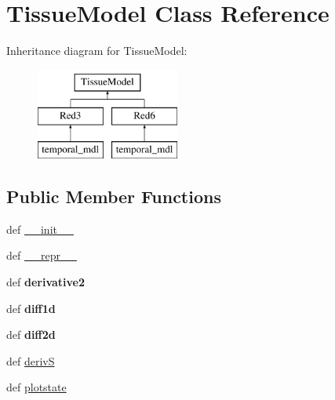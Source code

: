 \hypertarget{classcell__mdl2_1_1_tissue_model}{
\section{TissueModel Class Reference}
\label{classcell__mdl2_1_1_tissue_model}
}
Inheritance diagram for TissueModel:\begin{figure}[H]
\begin{center}
\leavevmode
\includegraphics[height=3cm]{classcell__mdl2_1_1_tissue_model}
\end{center}
\end{figure}
\subsection*{Public Member Functions}
\begin{DoxyCompactItemize}
\item 
def \hyperlink{classcell__mdl2_1_1_tissue_model_ac775ee34451fdfa742b318538164070e}{\_\-\_\-init\_\-\_\-}
\item 
def \hyperlink{classcell__mdl2_1_1_tissue_model_ad8b9328939df072e4740cd9a63189744}{\_\-\_\-repr\_\-\_\-}
\item 
\hypertarget{classcell__mdl2_1_1_tissue_model_a64b2d64d2cab831f5d9263e24bae5a7e}{
def {\bfseries derivative2}}
\label{classcell__mdl2_1_1_tissue_model_a64b2d64d2cab831f5d9263e24bae5a7e}

\item 
\hypertarget{classcell__mdl2_1_1_tissue_model_a9cc821f7aefa54284b62f694eac0864d}{
def {\bfseries diff1d}}
\label{classcell__mdl2_1_1_tissue_model_a9cc821f7aefa54284b62f694eac0864d}

\item 
\hypertarget{classcell__mdl2_1_1_tissue_model_ac60b77951425af4c19b532efbfae57ad}{
def {\bfseries diff2d}}
\label{classcell__mdl2_1_1_tissue_model_ac60b77951425af4c19b532efbfae57ad}

\item 
def \hyperlink{classcell__mdl2_1_1_tissue_model_a46f207ec6b3ff2a23c49b540aff0888e}{derivS}
\item 
def \hyperlink{classcell__mdl2_1_1_tissue_model_aa124f33cab14b4466d10c00c8ec82875}{plotstate}
\end{DoxyCompactItemize}
